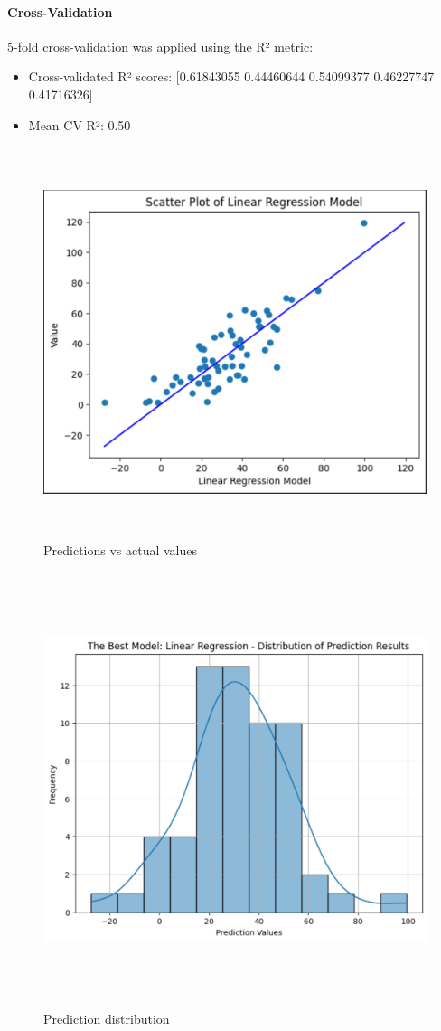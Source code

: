 \documentclass[12pt,a4paper]{report}
\begin{document}
\paragraph{Cross-Validation}
5-fold cross-validation was applied using the R² metric:
\begin{itemize}
    \item Cross-validated R² scores: [0.61843055 0.44460644 0.54099377 0.46227747 0.41716326]
    \item Mean CV R²: 0.50
\end{itemize}

\begin{figure}[H]
    \centering
    \includegraphics[width=6in,height=4.5in]{media/image5.png}
    \caption{Predictions vs actual values}
\end{figure}

\begin{figure}[H]
    \centering
    \includegraphics[width=6.5in,height=5in]{media/image1.png}
    \caption{Prediction distribution}
\end{figure}
\end{document}
